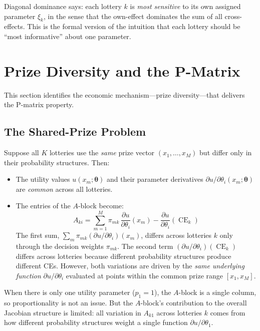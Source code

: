 \documentclass[11pt,a4paper]{article}
\theoremstyle{definition}
\newcommand{\btheta}{\boldsymbol{\theta}}
\DeclareMathOperator{\CE}{CE}
\begin{document}
Diagonal dominance says: each lottery $k$ is \emph{most sensitive} to its own
assigned parameter $\xi_k$, in the sense that the own-effect dominates the sum
of all cross-effects. This is the formal version of the intuition that each
lottery should be ``most informative'' about one parameter.


\section{Prize Diversity and the P-Matrix}
\label{sec:prize_diversity}

This section identifies the economic mechanism---prize diversity---that
delivers the P-matrix property.

\subsection{The Shared-Prize Problem}

Suppose all $K$ lotteries use the \emph{same} prize vector
$(x_1, \ldots, x_M)$ but differ only in their probability structures. Then:
\begin{itemize}
    \item The utility values $u(x_m; \btheta)$ and their parameter derivatives
    $\partial u / \partial \theta_i(x_m; \btheta)$ are \emph{common} across
    all lotteries.

    \item The entries of the $A$-block become:
    \begin{equation}
        A_{ki} = \sum_{m=1}^M \pi_{mk} \,
        \frac{\partial u}{\partial \theta_i}(x_m)
        - \frac{\partial u}{\partial \theta_i}(\CE_k)
    \end{equation}
    The first sum, $\sum_m \pi_{mk} (\partial u / \partial \theta_i)(x_m)$,
    differs across lotteries $k$ only through the decision weights $\pi_{mk}$.
    The second term $(\partial u / \partial \theta_i)(\CE_k)$ differs across
    lotteries because different probability structures produce different CEs.
    However, both variations are driven by the \emph{same underlying function}
    $\partial u / \partial \theta_i$ evaluated at points within the common
    prize range $[x_1, x_M]$.
\end{itemize}

When there is only one utility parameter ($p_1 = 1$), the $A$-block is a
single column, so proportionality is not an issue. But the $A$-block's
contribution to the overall Jacobian structure is limited: all variation in
$A_{k1}$ across lotteries $k$ comes from how different probability structures
weight a single function $\partial u / \partial \theta_1$.
\end{document}
